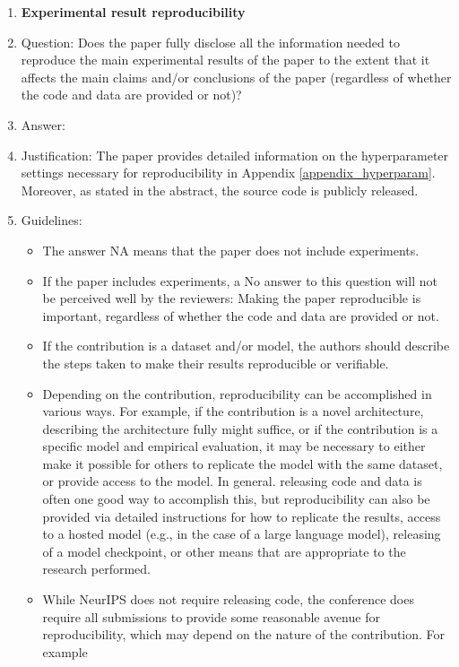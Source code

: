 \documentclass{article}
\begin{document}
\begin{enumerate}
    \item {\bf Experimental result reproducibility}
    \item[] Question: Does the paper fully disclose all the information needed to reproduce the main experimental results of the paper to the extent that it affects the main claims and/or conclusions of the paper (regardless of whether the code and data are provided or not)?
    \item[] Answer: \answerYes{} %
    \item[] Justification: The paper provides detailed information on the hyperparameter settings necessary for reproducibility in Appendix \ref{appendix_hyperparam}. Moreover, as stated in the abstract, the source code is publicly released.
    \item[] Guidelines:
    \begin{itemize}
        \item The answer NA means that the paper does not include experiments.
        \item If the paper includes experiments, a No answer to this question will not be perceived well by the reviewers: Making the paper reproducible is important, regardless of whether the code and data are provided or not.
        \item If the contribution is a dataset and/or model, the authors should describe the steps taken to make their results reproducible or verifiable. 
        \item Depending on the contribution, reproducibility can be accomplished in various ways. For example, if the contribution is a novel architecture, describing the architecture fully might suffice, or if the contribution is a specific model and empirical evaluation, it may be necessary to either make it possible for others to replicate the model with the same dataset, or provide access to the model. In general. releasing code and data is often one good way to accomplish this, but reproducibility can also be provided via detailed instructions for how to replicate the results, access to a hosted model (e.g., in the case of a large language model), releasing of a model checkpoint, or other means that are appropriate to the research performed.
        \item While NeurIPS does not require releasing code, the conference does require all submissions to provide some reasonable avenue for reproducibility, which may depend on the nature of the contribution. For example
        \begin{enumerate}

\end{enumerate}
\end{itemize}
\end{enumerate}
\end{document}
